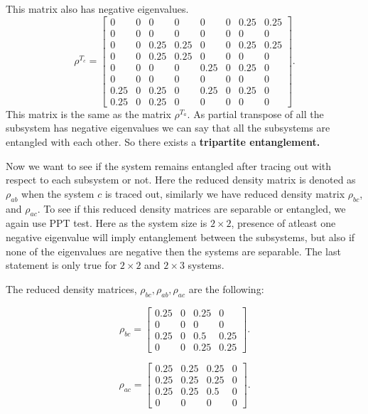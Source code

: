 \documentclass{amsart}
\theoremstyle{plain}
\theoremstyle{definition}
\theoremstyle{plain}
\begin{document}
 	This matrix also has negative eigenvalues.
 	\begin{equation*}
 		\rho^{T_c} = \left[\begin{matrix}0 & 0 & 0 & 0 & 0 & 0 & 0.25 & 0.25\\0 & 0 & 0 & 0 & 0 & 0 & 0 & 0\\0 & 0 & 0.25 & 0.25 & 0 & 0 & 0.25 & 0.25\\0 & 0 & 0.25 & 0.25 & 0 & 0 & 0 & 0\\0 & 0 & 0 & 0 & 0.25 & 0 & 0.25 & 0\\0 & 0 & 0 & 0 & 0 & 0 & 0 & 0\\0.25 & 0 & 0.25 & 0 & 0.25 & 0 & 0.25 & 0\\0.25 & 0 & 0.25 & 0 & 0 & 0 & 0 & 0\end{matrix}\right].
 	\end{equation*}
	This matrix is the same as the matrix $\rho^{T_a}$. As partial transpose of all the subsystem has negative eigenvalues we can say that all the subsystems are entangled with each other. So there exists a \textbf{tripartite entanglement.}
	
	Now we want to see if the system remains entangled after tracing out with respect to each subsystem or not. Here the reduced density matrix is denoted as $\rho_{ab}$ when the system $c$ is traced out, similarly we have reduced density matrix $\rho_{bc}$, and $\rho_{ac}$. To see if this reduced density matrices are separable or entangled, we again use PPT test. Here as the system size is $2 \times 2$, presence of atleast one negative eigenvalue will imply entanglement between the subsystems, but also if none of the eigenvalues are negative then the systems are separable. The last statement is only true for $2 \times 2$ and $2 \times 3$ systems.
	
	The reduced density matrices, $ \rho_{bc},\rho_{ab}, \rho_{ac}$ are the following:
	
	\begin{equation*}
		\rho_{bc} = \left[\begin{matrix}0.25 & 0 & 0.25 & 0\\0 & 0 & 0 & 0\\0.25 & 0 & 0.5 & 0.25\\0 & 0 & 0.25 & 0.25\end{matrix}\right].
	\end{equation*}

	\begin{equation*}
		\rho_{ac} = \left[\begin{matrix}0.25 & 0.25 & 0.25 & 0\\0.25 & 0.25 & 0.25 & 0\\0.25 & 0.25 & 0.5 & 0\\0 & 0 & 0 & 0\end{matrix}\right].
	\end{equation*}
\end{document}

